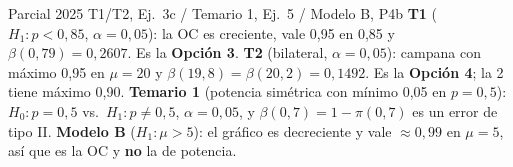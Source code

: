 \begin{modelo}{Parcial 2025 T1/T2, Ej.\ 3c / Temario 1, Ej.\ 5 / Modelo B, P4b}
\textbf{T1} ($H_1:p<0{,}85$, $\alpha=0{,}05$): la OC es creciente, vale 0,95 en 0,85 y $\beta(0{,}79)=0{,}2607$. Es la \textbf{Opción 3}.
\textbf{T2} (bilateral, $\alpha=0{,}05$): campana con máximo 0,95 en $\mu=20$ y $\beta(19{,}8)=\beta(20{,}2)=0{,}1492$. Es la \textbf{Opción 4}; la 2 tiene máximo 0,90.
\textbf{Temario 1} (potencia simétrica con mínimo 0,05 en $p=0{,}5$): $H_0:p=0{,}5$ vs.\ $H_1:p\neq0{,}5$, $\alpha=0{,}05$, y $\beta(0{,}7)=1-\pi(0{,}7)$ es un error de tipo II.
\textbf{Modelo B} ($H_1:\mu>5$): el gráfico es decreciente y vale $\approx0{,}99$ en $\mu=5$, así que es la OC y \textbf{no} la de potencia.
\end{modelo}

